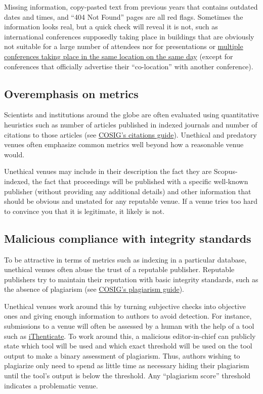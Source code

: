 \documentclass[letterpaper, 12pt]{article}
\begin{document}
Missing information, copy-pasted text from previous years that contains outdated dates and times,
and ``404 Not Found'' pages are all red flags.
Sometimes the information looks real, but a quick check will reveal it is not,
such as international conferences supposedly taking place in buildings that are
obviously not suitable for a large number of attendees nor for presentations or \href{https://doi.org/10.1038/d41586-024-02358-w}{multiple conferences taking place in the same location on the same day} (except for conferences that officially advertise their ``co-location'' with another conference).

\subsection*{Overemphasis on metrics}

Scientists and institutions around the globe are often evaluated using quantitative heuristics such as number of articles published in indexed journals and number of citations to those articles (see \href{https://osf.io/5vknq}{COSIG's citations guide}). Unethical and predatory venues often emphasize common metrics well beyond how a reasonable venue would.

Unethical venues may include in their description the fact they are Scopus-indexed,
the fact that proceedings will be published with a specific well-known publisher (without providing any additional details)
and other information that should be obvious and unstated for any reputable venue.
If a venue tries too hard to convince you that it is legitimate, it likely is not.

\subsection*{Malicious compliance with integrity standards}

To be attractive in terms of metrics such as indexing in a particular database,
unethical venues often abuse the trust of a reputable publisher.
Reputable publishers try to maintain their reputation with basic integrity standards, such as the absence of plagiarism (see \href{https://osf.io/ntcb4}{COSIG's plagiarism guide}).

Unethical venues work around this by turning subjective checks into objective ones
and giving enough information to authors to avoid detection.
For instance, submissions to a venue will often be assessed by a human with the help of a tool such as
\href{https://www.ithenticate.com/}{iThenticate}.
To work around this, a malicious editor-in-chief can publicly state which tool will be used
and which exact threshold will be used on the tool output to make a binary assessment of plagiarism.
Thus, authors wishing to plagiarize only need to spend as little time as necessary hiding their plagiarism
until the tool's output is below the threshold.
Any ``plagiarism score'' threshold indicates a problematic venue.
\end{document}
